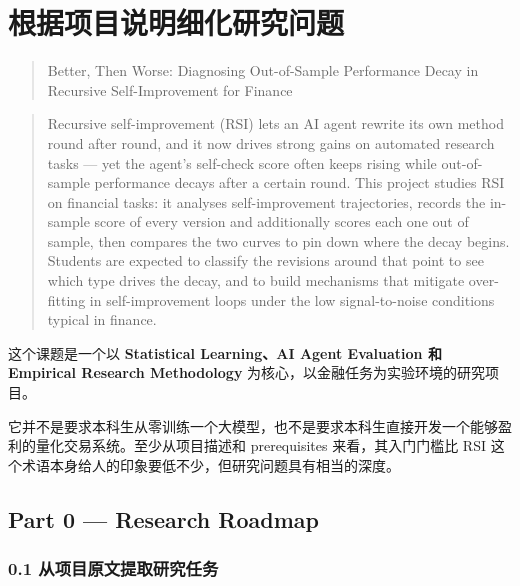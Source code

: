 \hypertarget{part-1-07-0001-ux6839ux636eux9879ux76eeux8bf4ux660eux7ec6ux5316ux7814ux7a76ux95eeux9898}{%
\section{根据项目说明细化研究问题}\label{part-1-07-0001-ux6839ux636eux9879ux76eeux8bf4ux660eux7ec6ux5316ux7814ux7a76ux95eeux9898}}

\begin{quote}
Better, Then Worse: Diagnosing Out-of-Sample Performance Decay in Recursive Self-Improvement for Finance
\end{quote}

\begin{quote}
Recursive self-improvement (RSI) lets an AI agent rewrite its own method round after round, and it now drives strong gains on automated research tasks --- yet the agent's self-check score often keeps rising while out-of-sample performance decays after a certain round. This project studies RSI on financial tasks: it analyses self-improvement trajectories, records the in-sample score of every version and additionally scores each one out of sample, then compares the two curves to pin down where the decay begins. Students are expected to classify the revisions around that point to see which type drives the decay, and to build mechanisms that mitigate over-fitting in self-improvement loops under the low signal-to-noise conditions typical in finance.
\end{quote}

这个课题是一个以 \textbf{Statistical Learning、AI Agent Evaluation 和 Empirical Research Methodology} 为核心，以金融任务为实验环境的研究项目。

它并不是要求本科生从零训练一个大模型，也不是要求本科生直接开发一个能够盈利的量化交易系统。至少从项目描述和 prerequisites 来看，其入门门槛比 RSI 这个术语本身给人的印象要低不少，但研究问题具有相当的深度。

\hypertarget{part-1-07-0001-part-0-research-roadmap}{%
\subsection{Part 0 --- Research Roadmap}\label{part-1-07-0001-part-0-research-roadmap}}

\hypertarget{part-1-07-0001-ux4eceux9879ux76eeux539fux6587ux63d0ux53d6ux7814ux7a76ux4efbux52a1}{%
\subsubsection{0.1 从项目原文提取研究任务}\label{part-1-07-0001-ux4eceux9879ux76eeux539fux6587ux63d0ux53d6ux7814ux7a76ux4efbux52a1}}

